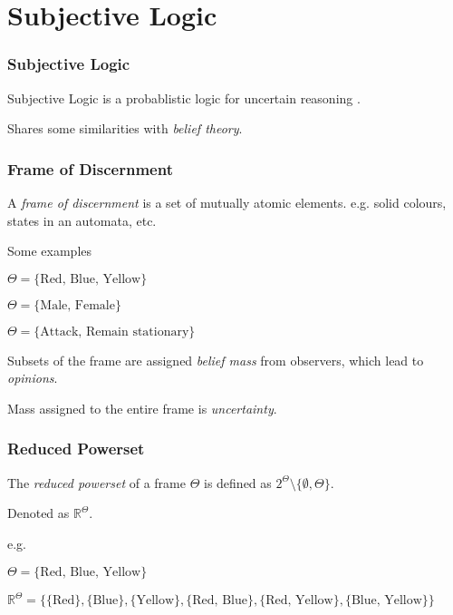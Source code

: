 \documentclass{beamer}
\begin{document}
%
%

\section{Subjective Logic}

\begin{frame}
\frametitle{Subjective Logic}

Subjective Logic is a probablistic logic for uncertain reasoning
\cite{josang_logic_2001}.

Shares some similarities with \emph{belief theory}.

\end{frame}


\begin{frame}
\frametitle{Frame of Discernment}

A \emph{frame of discernment} is a set of mutually atomic elements. e.g.
solid colours, states in an automata, etc.

Some examples

$\Theta = \lbrace \mbox{Red, Blue, Yellow} \rbrace$

$\Theta = \lbrace \mbox{Male, Female} \rbrace$

$\Theta = \lbrace \mbox{Attack, Remain stationary} \rbrace$

Subsets of the frame are assigned \emph{belief mass} from observers, which lead to
\emph{opinions}.

Mass assigned to the entire frame is \emph{uncertainty}.

\end{frame}


\begin{frame}
\frametitle{Reduced Powerset}

The \emph{reduced powerset} of a frame $\Theta$ is defined as $2^{\Theta} \setminus \lbrace \emptyset, \Theta \rbrace$.

Denoted as $\mathbb{R}^\Theta$.

e.g.

$\Theta = \lbrace \mbox{Red, Blue, Yellow} \rbrace$

$\mathbb{R}^\Theta = \lbrace
  \lbrace \mbox{Red} \rbrace,
  \lbrace \mbox{Blue} \rbrace,
  \lbrace \mbox{Yellow} \rbrace,
  \lbrace \mbox{Red, Blue} \rbrace,
  \lbrace \mbox{Red, Yellow} \rbrace,
  \lbrace \mbox{Blue, Yellow} \rbrace
  \rbrace$

\end{frame}
\end{document}
